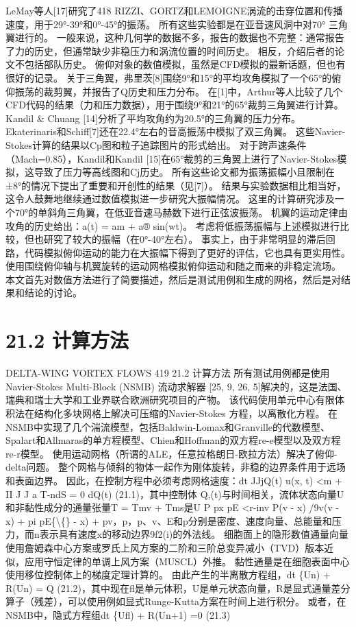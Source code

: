 \documentclass[UTF8,11pt,a4paper,openany,fontset=fandol]{ctexbook}
\begin{document}
LeMay等人[17]研究了418 RIZZI、GORTZ和LEMOIGNE涡流的击穿位置和传播速度，用于29°-39°和0°-45°的振荡。 所有这些实验都是在亚音速风洞中对70° 三角翼进行的。 一般来说，这种几何学的数据不多，报告的数据也不完整：通常报告了力的历史，但通常缺少非稳压力和涡流位置的时间历史。 相反，介绍后者的论文不包括部队历史。 俯仰对象的数值模拟，虽然是CFD模拟的最新话题，但也有很好的记录。 关于三角翼，弗里茨[8]围绕9°和15°的平均攻角模拟了一个65°的俯仰振荡的裁剪翼，并报告了Q历史和压力分布。 在[1]中，Arthur等人比较了几个CFD代码的结果（力和压力数据），用于围绕9°和21°的65°裁剪三角翼进行计算。 Kandil \& Chuang [14]分析了平均攻角约为20.5°的三角翼的压力分布。 Ekaterinaris和Schiff[7]还在22.4°左右的音高振荡中模拟了双三角翼。 这些Navier-Stokes计算的结果以Cp图和粒子追踪图片的形式给出。 对于跨声速条件（Mach=0.85），Kandil和Kandil [15]在65°裁剪的三角翼上进行了Navier-Stokes模拟，这导致了压力等高线图和Cj历史。 所有这些论文都为振荡振幅小且限制在±8°的情况下提出了重要和开创性的结果（见[7]）。 结果与实验数据相比相当好，这令人鼓舞地继续通过数值模拟进一步研究大振幅情况。 这里的计算研究涉及一个70°的单斜角三角翼，在低亚音速马赫数下进行正弦波振荡。 机翼的运动定律由攻角的历史给出：a(t) = am + a® sin(wt)。 考虑将低振荡振幅与上述模拟进行比较，但也研究了较大的振幅（在0°-40°左右）。 事实上，由于非常明显的滞后回路，代码模拟俯仰运动的能力在大振幅下得到了更好的评估，它也具有更实用性。 使用围绕俯仰轴与机翼旋转的运动网格模拟俯仰运动和随之而来的非稳定流场。 本文首先对数值方法进行了简要描述，然后是测试用例和生成的网格，然后是对结果和结论的讨论。

\section{21.2 计算方法}
DELTA-WING VORTEX FLOWS 419 21.2 计算方法 所有测试用例都是使用Navier-Stokes Multi-Block (NSMB) 流动求解器 [25, 9, 26, 5]解决的，这是法国、瑞典和瑞士大学和工业界联合欧洲研究项目的产物。 该代码使用单元中心有限体积法在结构化多块网格上解决可压缩的Navier-Stokes 方程，以离散化方程。 在NSMB中实现了几个湍流模型，包括Baldwin-Lomax和Granville的代数模型、Spalart和Allmaras的单方程模型、Chien和Hoffman的双方程re-e模型以及双方程re-r模型。 使用运动网格（所谓的ALE，任意拉格朗日-欧拉方法）解决了俯仰-delta问题。 整个网格与倾斜的物体一起作为刚体旋转，非稳的边界条件用于远场和表面边界。 因此，在控制方程中必须考虑网格速度：dt JJjQ(t) u(x, t) <m + II J J a T-ndS = 0 dQ(t) (21.1)，其中控制体 Q,(t)与时间相关，流体状态向量U和非黏性成分的通量张量T = Tmv + Tms是U P px pE <r-inv P(v - x) /9v(v - x) + pi pE\{\textbackslash\{\} - x) + pv，p，p、v、E和p分别是密度、速度向量、总能量和压力，而n表示具有速度x的移动边界9f2(i)的外法线。 细胞面上的隐形数值通量向量使用詹姆森中心方案或罗氏上风方案的二阶和三阶总变异减小（TVD）版本近似，应用守恒定律的单调上风方案（MUSCL）外推。 黏性通量是在细胞表面中心使用移位控制体上的梯度定理计算的。 由此产生的半离散方程组，dt \{Un) + R(Un) = Q (21.2)，其中现在fl是单元体积，U是单元状态向量，R是显式通量差分算子（残差），可以使用例如显式Runge-Kutta方案在时间上进行积分。 或者，在NSMB中，隐式方程组dt \{Ufl) + R(Un+1) =0 (21.3)
\end{document}

